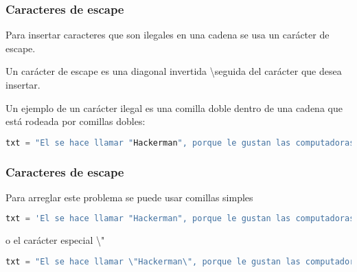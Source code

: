 \begin{frame}[fragile]
  \frametitle{Caracteres de escape}

  Para insertar caracteres que son ilegales en una cadena se
  usa un carácter de escape.

  \vspace{\baselineskip}
  Un carácter de escape es una diagonal invertida \textbackslash  seguida del
  carácter que desea insertar.

  \vspace{\baselineskip}
  Un ejemplo de un carácter ilegal es una comilla doble dentro
  de una cadena que está rodeada por comillas dobles:

  \vspace{\baselineskip}
  \begin{lstlisting}[language=Python]
  txt = "El se hace llamar "Hackerman", porque le gustan las computadoras"
  \end{lstlisting}
\end{frame}

\begin{frame}[fragile]
  \frametitle{Caracteres de escape}

  Para arreglar este problema se puede usar comillas simples

  \vspace{\baselineskip}
  \begin{lstlisting}[language=Python]
  txt = 'El se hace llamar "Hackerman", porque le gustan las computadoras'
  \end{lstlisting}

  \vspace{\baselineskip}
  o el carácter especial \textbackslash"

  \vspace{\baselineskip}
  \begin{lstlisting}[language=Python]
  txt = "El se hace llamar \"Hackerman\", porque le gustan las computadoras"
  \end{lstlisting}
\end{frame}

